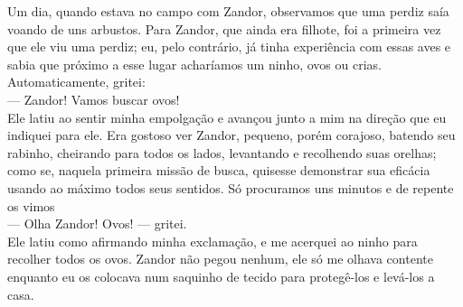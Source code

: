 Um dia, quando estava no campo com Zandor, observamos que uma perdiz saía voando de uns arbustos. Para Zandor, que ainda era filhote, foi a primeira vez que ele viu uma perdiz; eu, pelo contrário, já tinha experiência com essas aves e sabia que próximo a esse lugar acharíamos um ninho, ovos ou crias. 
Automaticamente, gritei:\\\indent
--- Zandor! Vamos buscar ovos!\\\indent
Ele latiu ao sentir minha empolgação e avançou junto a mim na direção que eu indiquei para ele. 
Era gostoso ver Zandor, pequeno, porém corajoso, batendo seu rabinho, cheirando para todos os lados, levantando e recolhendo suas orelhas; como se, naquela primeira missão de busca, quisesse demonstrar sua eficácia usando ao máximo todos seus sentidos. 
Só procuramos uns minutos e de repente os vimos\\\indent
--- Olha Zandor! Ovos! --- gritei.\\\indent
Ele latiu como afirmando minha exclamação, e me acerquei ao ninho para recolher todos os ovos. Zandor não pegou nenhum, ele só me olhava contente enquanto eu os colocava num saquinho de tecido para protegê-los e levá-los a casa. 


